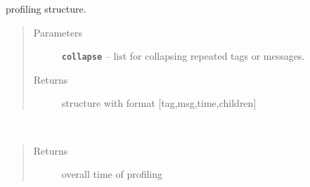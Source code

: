 \documentclass[letterpaper,10pt,english]{sphinxmanual}
\begin{document}
\begin{fulllineitems}
\begin{fulllineitems}
\label{RRtoolbox.lib:RRtoolbox.lib.root.Profiler.structure}
profiling structure.
\begin{quote}\begin{description}
\item[{Parameters}] \leavevmode
\textbf{\texttt{collapse}} -- list for collapsing repeated tags or messages.

\item[{Returns}] \leavevmode
structure with format {[}tag,msg,time,children{]}

\end{description}\end{quote}

\end{fulllineitems}


\begin{fulllineitems}
\label{RRtoolbox.lib:RRtoolbox.lib.root.Profiler.time}~\begin{quote}\begin{description}
\item[{Returns}] \leavevmode
overall time of profiling

\end{description}\end{quote}

\end{fulllineitems}


\end{fulllineitems}

\end{document}

